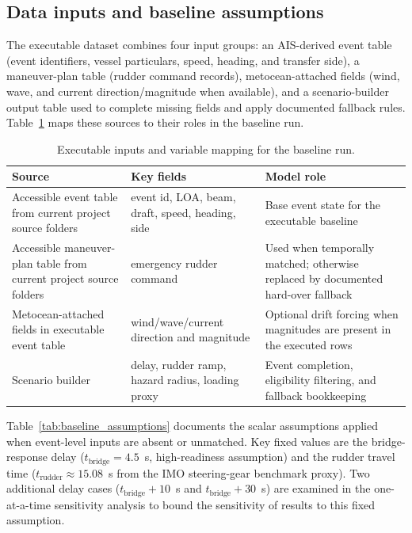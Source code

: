 \documentclass[preprint,12pt]{elsarticle}
\begin{document}
\subsection{Data inputs and baseline assumptions}
The executable dataset combines four input groups: an AIS-derived event table (event identifiers, vessel particulars, speed, heading, and transfer side), a maneuver-plan table (rudder command records), metocean-attached fields (wind, wave, and current direction/magnitude when available), and a scenario-builder output table used to complete missing fields and apply documented fallback rules. Table~\ref{tab:data_mapping} maps these sources to their roles in the baseline run.

\begin{table}[H]
\centering
\caption{Executable inputs and variable mapping for the baseline run.}
\label{tab:data_mapping}
\begin{tabular}{p{}p{}p{}}
\toprule
Source & Key fields & Model role \\
\midrule
Accessible event table from current project source folders & event id, LOA, beam, draft, speed, heading, side & Base event state for the executable baseline \\
Accessible maneuver-plan table from current project source folders & emergency rudder command & Used when temporally matched; otherwise replaced by documented hard-over fallback \\
Metocean-attached fields in executable event table & wind/wave/current direction and magnitude & Optional drift forcing when magnitudes are present in the executed rows \\
Scenario builder & delay, rudder ramp, hazard radius, loading proxy & Event completion, eligibility filtering, and fallback bookkeeping \\
\bottomrule
\end{tabular}
\end{table}

Table~\ref{tab:baseline_assumptions} documents the scalar assumptions applied when event-level inputs are absent or unmatched. Key fixed values are the bridge-response delay ($t_{\mathrm{bridge}}=4.5$~s, high-readiness assumption) and the rudder travel time ($t_{\mathrm{rudder}}\approx15.08$~s from the IMO steering-gear benchmark proxy). Two additional delay cases ($t_{\mathrm{bridge}}+10$~s and $t_{\mathrm{bridge}}+30$~s) are examined in the one-at-a-time sensitivity analysis to bound the sensitivity of results to this fixed assumption.
\end{document}
